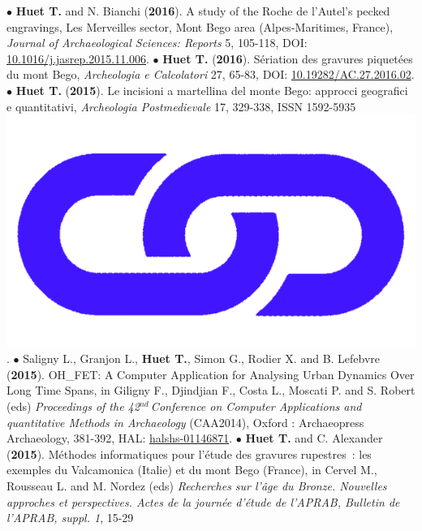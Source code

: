 \documentclass{article}
\begin{document}
\smallbreak
$\bullet$ \textbf{Huet T.} and N. Bianchi (\textbf{2016}). A study of the Roche de l'Autel's pecked engravings, Les Merveilles sector, Mont Bego area (Alpes-Maritimes, France), \textit{Journal of Archaeological Sciences: Reports} 5, 105-118, DOI: \href{https://doi.org/10.1016/j.jasrep.2015.11.006}{10.1016/j.jasrep.2015.11.006}.
\smallbreak
$\bullet$ \textbf{Huet T.} (\textbf{2016}). S\'{e}riation des gravures piquet\'{e}es du mont Bego, \textit{Archeologia e Calcolatori} 27, 65-83, DOI: \href{https://doi.org/10.19282/AC.27.2016.02}{10.19282/AC.27.2016.02}.
\smallbreak
$\bullet$ \textbf{Huet T.} (\textbf{2015}). Le incisioni a martellina del monte Bego: approcci geografici e quantitativi, \textit{Archeologia Postmedievale} 17, 329-338, ISSN 1592-5935 \href{https://www.insegnadelgiglio.it/wp-content/uploads/2015/01/APM_17_libro-anteprima.pdf}{\includegraphics[scale=0.02]{link_darkblue.png}}.
\smallbreak
$\bullet$ Saligny L., Granjon L., \textbf{Huet T.}, Simon G., Rodier X. and B. Lefebvre (\textbf{2015}). OH\_FET: A Computer Application for Analysing Urban Dynamics Over Long Time Spans, in Giligny F., Djindjian F., Costa L., Moscati P. and S. Robert (eds) \textit{Proceedings of the 42${}^{nd\ }$Conference on Computer Applications and quantitative Methods in Archaeology} (CAA2014), Oxford : Archaeopress Archaeology, 381-392, HAL: \href{https://hal.archives-ouvertes.fr/halshs-01146871}{halshs-01146871}.
\smallbreak
$\bullet$ \textbf{Huet T.} and C. Alexander (\textbf{2015}). M\'{e}thodes informatiques pour l'\'{e}tude des gravures rupestres~: les exemples du Valcamonica (Italie) et du mont Bego (France), in Cervel M., Rousseau L. and M. Nordez (eds) \textit{Recherches sur l'\^{a}ge du Bronze. Nouvelles approches et perspectives. Actes de la journ\'{e}e d'\'{e}tude de l'APRAB, Bulletin de l'APRAB, suppl. 1}, 15-29 
\end{document}
